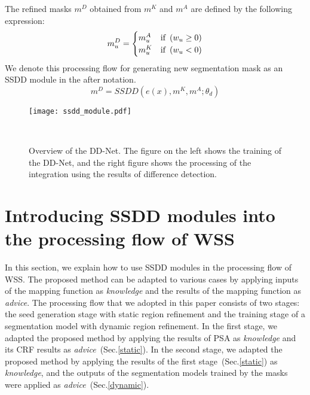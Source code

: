 \documentclass[10pt,twocolumn,letterpaper]{article}
\begin{document}
The refined masks $ m^{D} $ obtained from $ m^{K}$ and $m^{A} $ are defined by the following expression:
\begin{equation}
 m^{D}_{u} = 
\begin{cases}
  m^{A}_{u} & {\rm if}\hspace{1.5mm}(w_{u} \geq 0) \\
  m^{K}_{u} & {\rm if}\hspace{1.5mm}(w_{u} < 0) \\ 
\end{cases}
\end{equation}
We denote this processing flow for generating new segmentation mask as an SSDD module in the after notation.
\begin{equation}
 m^{D} = SSDD(e(x), m^{K},m^{A};\theta_{d})
\end{equation}

\begin{figure}[tb]
\begin{center}
\texttt{[image: ssdd\_module.pdf]}
\caption{Overview of the DD-Net. The figure on the left shows the training of the DD-Net, and the right figure shows the processing of the integration using the results of difference detection.} \label{fig_ssdd_module}
\vskip -5mm~
\end{center}
\end{figure}

\section{Introducing SSDD modules into the processing flow of WSS \label{application}}
In this section, we explain how to use SSDD modules in the processing flow of WSS.
The proposed method can be adapted to various cases by applying inputs of the mapping function as {\it knowledge} and the results of the mapping function as {\it advice}.
The processing flow that we adopted in this paper consists of two stages:
the seed generation stage with static region refinement and 
the training stage of a segmentation model with dynamic region refinement.
In the first stage, we adapted the proposed method by applying the results of PSA as {\it knowledge} and its CRF results as 
{\it advice}~(Sec.\ref{static}).
In the second stage, we adapted the proposed method by applying the results of the first stage~(Sec.\ref{static}) as {\it knowledge}, and the outputs of the segmentation models trained by the masks were applied as {\it advice}~(Sec.\ref{dynamic}).
\end{document}
